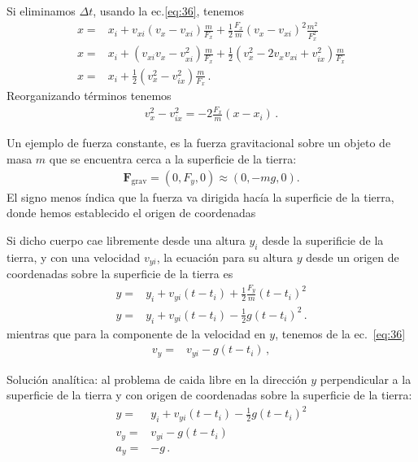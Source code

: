 Si eliminamos $\Delta t$, usando la ec.\eqref{eq:36}, tenemos
\begin{align*}
  x=&x_i +v_{xi}(v_x-v_{xi})\frac{m}{F_x}+\frac{1}{2}\frac{F_x}{m}(v_x-v_{xi})^2\frac{m^2}{F_x^2}\nonumber\\
  x=&x_i +(v_{xi}v_x-v_{xi}^2)\frac{m}{F_x}+\frac{1}{2}(v_x^2-2 v_x v_{xi}+v_{ix}^2)\frac{m}{F_x}\nonumber\\
x=&x_i +\frac{1}{2}(v_x^2-v_{ix}^2)\frac{m}{F_x}\,.
\end{align*}
Reorganizando términos tenemos
\begin{align}
  \label{eq:tray0}
  v_x^2-v_{ix}^2=-2\frac{F_x}{m}(x-x_i)\,.
\end{align}


Un ejemplo de fuerza constante, es la fuerza gravitacional sobre un objeto de masa $m$ que se encuentra cerca a la superficie de la tierra:
\begin{align}
  \label{eq:29}
  \mathbf{F}_{\text{grav}}=(0,F_y,0)\approx(0,-mg,0).
\end{align}
El signo menos índica que la fuerza va dirigida hacía la superficie de la tierra, donde hemos establecido el origen de coordenadas

Si dicho cuerpo cae libremente desde una altura $y_i$ desde la superificie de la tierra, y con una velocidad $v_{yi}$, la ecuación para su altura $y$ desde un origen de coordenadas sobre la superficie de la tierra es
\begin{align}
\label{eq:31}
   y=&y_i+v_{yi}(t-t_i)+\frac{1}{2}\frac{F_y}{m}(t-t_i)^2\nonumber\\
   y=&y_i+v_{yi}(t-t_i)-\frac{1}{2}g(t-t_i)^2\,.
\end{align}
mientras que para la componente de la velocidad en $y$, tenemos de la ec.~\eqref{eq:36}
\begin{align}
  \label{eq:37}
    v_y =&v_{yi}-g(t-t_i)\,,
\end{align}

\begin{frame}
  \begin{block}%
{Solución analítica:} al problema de caida libre en la dirección $y$ perpendicular a la superficie de la tierra y con origen de coordenadas sobre la superficie de la tierra:
\begin{align*}
     y=&y_i+v_{yi}(t-t_i)-\frac{1}{2}g(t-t_i)^2\nonumber\\
     v_y =&v_{yi}-g(t-t_i)\nonumber\\
     a_y=&-g\,.
\end{align*}

  \end{block}
\end{frame}



